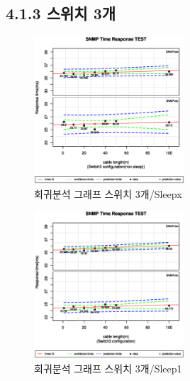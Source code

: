 \documentclass[11pt
  , a4paper
  , article
  , oneside
]{memoir}
\begin{document}
\subsection{4.1.3 스위치 3개}
 \begin{figure}[!htb]
  \centering
  \includegraphics[width=0.5\textwidth]{./images/s3sx.eps}
  \caption{회귀분석 그래프 스위치 3개/Sleepx}
\end{figure}
 \begin{figure}[!htb]
  \centering
  \includegraphics[width=0.5\textwidth]{./images/s3s1.eps}
  \caption{회귀분석 그래프 스위치 3개/Sleep1}
\end{figure}

\clearpage
\end{document}
